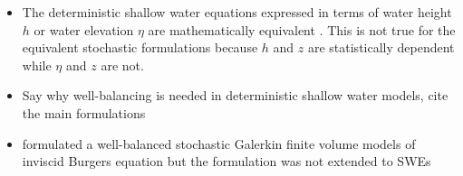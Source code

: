 \documentclass[Journal,letterpaper,InsideFigs,SingleSpace,NoLineNumbers]{ascelike-new}
\begin{document}
\begin{itemize}
    \item The deterministic shallow water equations expressed in terms of water height $h$ or water elevation $\eta$ are mathematically equivalent \citep{lu-xie2016}.
    This is not true for the equivalent stochastic formulations because $h$ and $z$ are statistically dependent while $\eta$ and $z$ are not.
    \item Say why well-balancing is needed in deterministic shallow water models, cite the main formulations
    \item \citet{jin2016} formulated a well-balanced stochastic Galerkin finite volume models of inviscid Burgers equation but the formulation was not extended to SWEs
\end{itemize}





\end{document}
